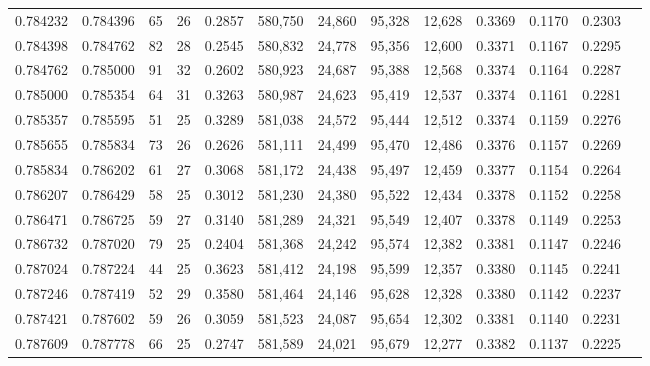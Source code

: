 \begin{tabular}{rrrrrrrrrrrrr}
0.784232 & 0.784396 &     65 &    26 &                                     0.2857 & 580,750 &  24,860 &  95,328 &  12,628 & 0.3369 & 0.1170 & 0.2303 \\
0.784398 & 0.784762 &     82 &    28 &                                     0.2545 & 580,832 &  24,778 &  95,356 &  12,600 & 0.3371 & 0.1167 & 0.2295 \\
0.784762 & 0.785000 &     91 &    32 &                                     0.2602 & 580,923 &  24,687 &  95,388 &  12,568 & 0.3374 & 0.1164 & 0.2287 \\
0.785000 & 0.785354 &     64 &    31 &                                     0.3263 & 580,987 &  24,623 &  95,419 &  12,537 & 0.3374 & 0.1161 & 0.2281 \\
0.785357 & 0.785595 &     51 &    25 &                                     0.3289 & 581,038 &  24,572 &  95,444 &  12,512 & 0.3374 & 0.1159 & 0.2276 \\
0.785655 & 0.785834 &     73 &    26 &                                     0.2626 & 581,111 &  24,499 &  95,470 &  12,486 & 0.3376 & 0.1157 & 0.2269 \\
0.785834 & 0.786202 &     61 &    27 &                                     0.3068 & 581,172 &  24,438 &  95,497 &  12,459 & 0.3377 & 0.1154 & 0.2264 \\
0.786207 & 0.786429 &     58 &    25 &                                     0.3012 & 581,230 &  24,380 &  95,522 &  12,434 & 0.3378 & 0.1152 & 0.2258 \\
0.786471 & 0.786725 &     59 &    27 &                                     0.3140 & 581,289 &  24,321 &  95,549 &  12,407 & 0.3378 & 0.1149 & 0.2253 \\
0.786732 & 0.787020 &     79 &    25 &                                     0.2404 & 581,368 &  24,242 &  95,574 &  12,382 & 0.3381 & 0.1147 & 0.2246 \\
0.787024 & 0.787224 &     44 &    25 &                                     0.3623 & 581,412 &  24,198 &  95,599 &  12,357 & 0.3380 & 0.1145 & 0.2241 \\
0.787246 & 0.787419 &     52 &    29 &                                     0.3580 & 581,464 &  24,146 &  95,628 &  12,328 & 0.3380 & 0.1142 & 0.2237 \\
0.787421 & 0.787602 &     59 &    26 &                                     0.3059 & 581,523 &  24,087 &  95,654 &  12,302 & 0.3381 & 0.1140 & 0.2231 \\
0.787609 & 0.787778 &     66 &    25 &                                     0.2747 & 581,589 &  24,021 &  95,679 &  12,277 & 0.3382 & 0.1137 & 0.2225 \\

\end{tabular}
